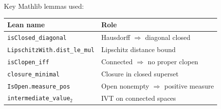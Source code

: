 \documentclass[11pt]{article}
\begin{document}
Key Mathlib lemmas used:
\begin{center}
\small
\begin{tabular}{@{}ll@{}}
\toprule
\textbf{Lean name} & \textbf{Role} \\
\midrule
\texttt{isClosed\_diagonal} & Hausdorff $\Rightarrow$ diagonal closed \\
\texttt{LipschitzWith.dist\_le\_mul} & Lipschitz distance bound \\
\texttt{isClopen\_iff} & Connected $\Rightarrow$ no proper clopen \\
\texttt{closure\_minimal} & Closure in closed superset \\
\texttt{IsOpen.measure\_pos} & Open nonempty $\Rightarrow$ positive measure \\
\texttt{intermediate\_value$_2$} & IVT on connected spaces \\
\bottomrule
\end{tabular}
\end{center}
\end{document}
